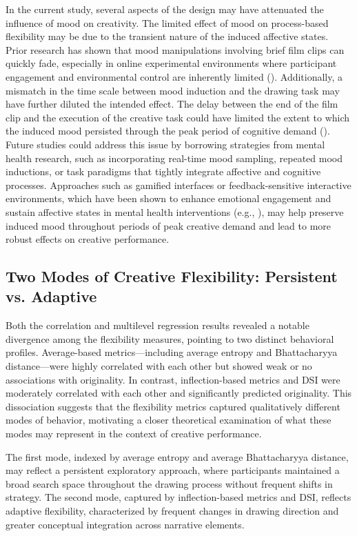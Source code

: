 \documentclass[../MA_Thesis.tex]{subfiles}
\begin{document}
In the current study, several aspects of the design may have attenuated the influence of mood on creativity. The limited effect of mood on process-based flexibility may be due to the transient nature of the induced affective states. Prior research has shown that mood manipulations involving brief film clips can quickly fade, especially in online experimental environments where participant engagement and environmental control are inherently limited (\cite{fong_effects_2006}). Additionally, a mismatch in the time scale between mood induction and the drawing task may have further diluted the intended effect. The delay between the end of the film clip and the execution of the creative task could have limited the extent to which the induced mood persisted through the peak period of cognitive demand (\cite{monno_duration_2024}). Future studies could address this issue by borrowing strategies from mental health research, such as incorporating real-time mood sampling, repeated mood inductions, or task paradigms that tightly integrate affective and cognitive processes. Approaches such as gamified interfaces or feedback-sensitive interactive environments, which have been shown to enhance emotional engagement and sustain affective states in mental health interventions (e.g., \cite{balaskas_ecological_2021}), may help preserve induced mood throughout periods of peak creative demand and lead to more robust effects on creative performance.

\subsection*{Two Modes of Creative Flexibility: Persistent vs. Adaptive}
Both the correlation and multilevel regression results revealed a notable divergence among the flexibility measures, pointing to two distinct behavioral profiles. Average-based metrics—including average entropy and Bhattacharyya distance—were highly correlated with each other but showed weak or no associations with originality. In contrast, inflection-based metrics and DSI were moderately correlated with each other and significantly predicted originality. This dissociation suggests that the flexibility metrics captured qualitatively different modes of behavior, motivating a closer theoretical examination of what these modes may represent in the context of creative performance.

The first mode, indexed by average entropy and average Bhattacharyya distance, may reflect a persistent exploratory approach, where participants maintained a broad search space throughout the drawing process without frequent shifts in strategy. The second mode, captured by inflection-based metrics and DSI, reflects adaptive flexibility, characterized by frequent changes in drawing direction and greater conceptual integration across narrative elements.
\end{document}
